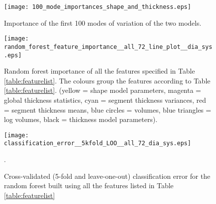 \documentclass{llncs}
\begin{document}
		\begin{figure}[]
		\begin{center}
		
		\texttt{[image: 100\_mode\_importances\_shape\_and\_thickness.eps]}
	\caption{Importance of the first 100 modes of variation of the two models.}	
\label{fig:random_forest_feature_importance__100_shape_eigenvalues__and_100_thickness_modes_dia_sys}			\end{center}
		\end{figure}

	
		\begin{figure}[]
		\begin{center}
		
		\texttt{[image: random\_forest\_feature\_importance\_\_all\_72\_line\_plot\_\_dia\_sys.eps]}
		
\caption{Random forest importance of all the features specified in Table \ref{table:featurelist}. The colours group the features according to Table \ref{table:featurelist}. (yellow = shape model parameters, magenta = global thickness statistics, cyan = segment thickness variances, red = segment thickness means, blue circles = volumes, blue triangles = log volumes, black = thickness model parameters).}
\label{fig:random_forest_feature_importance__all_72__dia_sys}		\end{center}
	\end{figure}
	
	\begin{figure}[]
	\begin{center}
	

		\texttt{[image: classification\_error\_\_5kfold\_LOO\_\_all\_72\_dia\_sys.eps]}
\caption{Cross-validated (5-fold and leave-one-out) classification error for the random forest built using all the features listed in Table \ref{table:featurelist}}.	
\label{fig:classification_error__5kfold_LOO__all_72_dia_sys}			\end{center}
		\end{figure}
		
\end{document}
